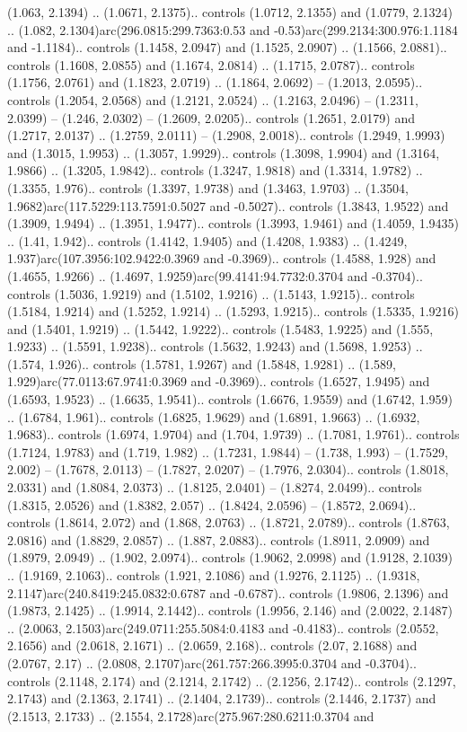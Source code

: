 (1.063, 2.1394) .. (1.0671, 2.1375).. controls (1.0712, 2.1355) and (1.0779, 2.1324) .. (1.082, 2.1304)arc(296.0815:299.7363:0.53 and -0.53)arc(299.2134:300.976:1.1184 and -1.1184).. controls (1.1458, 2.0947) and (1.1525, 2.0907) .. (1.1566, 2.0881).. controls (1.1608, 2.0855) and (1.1674, 2.0814) .. (1.1715, 2.0787).. controls (1.1756, 2.0761) and (1.1823, 2.0719) .. (1.1864, 2.0692) -- (1.2013, 2.0595).. controls (1.2054, 2.0568) and (1.2121, 2.0524) .. (1.2163, 2.0496) -- (1.2311, 2.0399) -- (1.246, 2.0302) -- (1.2609, 2.0205).. controls (1.2651, 2.0179) and (1.2717, 2.0137) .. (1.2759, 2.0111) -- (1.2908, 2.0018).. controls (1.2949, 1.9993) and (1.3015, 1.9953) .. (1.3057, 1.9929).. controls (1.3098, 1.9904) and (1.3164, 1.9866) .. (1.3205, 1.9842).. controls (1.3247, 1.9818) and (1.3314, 1.9782) .. (1.3355, 1.976).. controls (1.3397, 1.9738) and (1.3463, 1.9703) .. (1.3504, 1.9682)arc(117.5229:113.7591:0.5027 and -0.5027).. controls (1.3843, 1.9522) and (1.3909, 1.9494) .. (1.3951, 1.9477).. controls (1.3993, 1.9461) and (1.4059, 1.9435) .. (1.41, 1.942).. controls (1.4142, 1.9405) and (1.4208, 1.9383) .. (1.4249, 1.937)arc(107.3956:102.9422:0.3969 and -0.3969).. controls (1.4588, 1.928) and (1.4655, 1.9266) .. (1.4697, 1.9259)arc(99.4141:94.7732:0.3704 and -0.3704).. controls (1.5036, 1.9219) and (1.5102, 1.9216) .. (1.5143, 1.9215).. controls (1.5184, 1.9214) and (1.5252, 1.9214) .. (1.5293, 1.9215).. controls (1.5335, 1.9216) and (1.5401, 1.9219) .. (1.5442, 1.9222).. controls (1.5483, 1.9225) and (1.555, 1.9233) .. (1.5591, 1.9238).. controls (1.5632, 1.9243) and (1.5698, 1.9253) .. (1.574, 1.926).. controls (1.5781, 1.9267) and (1.5848, 1.9281) .. (1.589, 1.929)arc(77.0113:67.9741:0.3969 and -0.3969).. controls (1.6527, 1.9495) and (1.6593, 1.9523) .. (1.6635, 1.9541).. controls (1.6676, 1.9559) and (1.6742, 1.959) .. (1.6784, 1.961).. controls (1.6825, 1.9629) and (1.6891, 1.9663) .. (1.6932, 1.9683).. controls (1.6974, 1.9704) and (1.704, 1.9739) .. (1.7081, 1.9761).. controls (1.7124, 1.9783) and (1.719, 1.982) .. (1.7231, 1.9844) -- (1.738, 1.993) -- (1.7529, 2.002) -- (1.7678, 2.0113) -- (1.7827, 2.0207) -- (1.7976, 2.0304).. controls (1.8018, 2.0331) and (1.8084, 2.0373) .. (1.8125, 2.0401) -- (1.8274, 2.0499).. controls (1.8315, 2.0526) and (1.8382, 2.057) .. (1.8424, 2.0596) -- (1.8572, 2.0694).. controls (1.8614, 2.072) and (1.868, 2.0763) .. (1.8721, 2.0789).. controls (1.8763, 2.0816) and (1.8829, 2.0857) .. (1.887, 2.0883).. controls (1.8911, 2.0909) and (1.8979, 2.0949) .. (1.902, 2.0974).. controls (1.9062, 2.0998) and (1.9128, 2.1039) .. (1.9169, 2.1063).. controls (1.921, 2.1086) and (1.9276, 2.1125) .. (1.9318, 2.1147)arc(240.8419:245.0832:0.6787 and -0.6787).. controls (1.9806, 2.1396) and (1.9873, 2.1425) .. (1.9914, 2.1442).. controls (1.9956, 2.146) and (2.0022, 2.1487) .. (2.0063, 2.1503)arc(249.0711:255.5084:0.4183 and -0.4183).. controls (2.0552, 2.1656) and (2.0618, 2.1671) .. (2.0659, 2.168).. controls (2.07, 2.1688) and (2.0767, 2.17) .. (2.0808, 2.1707)arc(261.757:266.3995:0.3704 and -0.3704).. controls (2.1148, 2.174) and (2.1214, 2.1742) .. (2.1256, 2.1742).. controls (2.1297, 2.1743) and (2.1363, 2.1741) .. (2.1404, 2.1739).. controls (2.1446, 2.1737) and (2.1513, 2.1733) .. (2.1554, 2.1728)arc(275.967:280.6211:0.3704 and 
